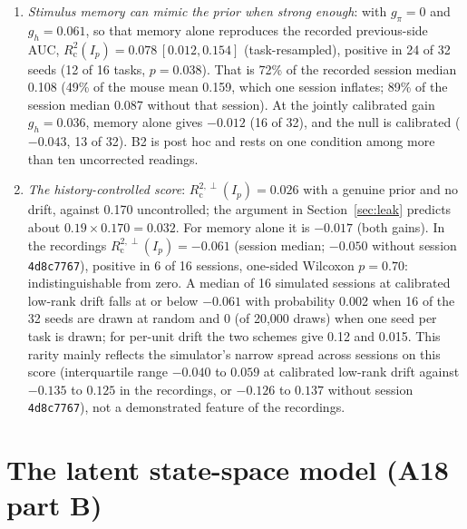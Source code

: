 \documentclass[11pt]{article}
\newcommand{\Rc}{R^2_{\mathrm{c}}}
\begin{document}
\begin{enumerate}
  therefore does not show that a prior is needed.
\item \emph{Stimulus memory can mimic the prior when strong enough}: with $g_\pi = 0$ and $g_h = 0.061$, so that memory
  alone reproduces the recorded previous-side AUC, $\Rc(I_p) = 0.078\,[0.012, 0.154]$ (task-resampled), positive in 24 of 32 seeds (12
  of 16 tasks, $p = 0.038$). That is 72\% of the recorded session median 0.108 (49\% of the mouse mean 0.159, which one
  session inflates; 89\% of the session median 0.087 without that session). At the jointly calibrated gain
  $g_h = 0.036$, memory alone gives $-0.012$ (16 of 32), and the null is calibrated ($-0.043$, 13 of 32). B2 is post hoc
  and rests on one condition among more than ten uncorrected readings.
\item \emph{The history-controlled score}: $R^{2,\perp}_{\mathrm{c}}(I_p) = 0.026$ with a genuine prior and no drift, against
  0.170 uncontrolled; the argument in Section~\ref{sec:leak} predicts about $0.19 \times 0.170 = 0.032$. For memory
  alone it is $-0.017$ (both gains). In the recordings $R^{2,\perp}_{\mathrm{c}}(I_p) = -0.061$ (session median;
  $-0.050$ without session \texttt{4d8c7767}), positive in 6 of 16 sessions, one-sided Wilcoxon $p = 0.70$:
  indistinguishable from zero. A median of 16 simulated sessions at calibrated low-rank drift falls at or below
  $-0.061$ with probability 0.002 when 16 of the 32 seeds are drawn at random and 0 (of 20,000 draws) when one seed per
  task is drawn; for per-unit drift the two schemes give 0.12 and 0.015. This rarity mainly reflects the simulator's
  narrow spread across sessions on this score (interquartile range $-0.040$ to $0.059$ at calibrated low-rank drift
  against $-0.135$ to $0.125$ in the recordings, or $-0.126$ to $0.137$ without session \texttt{4d8c7767}), not a
  demonstrated feature of the recordings.
\end{enumerate}

\section{The latent state-space model (A18 part B)}
\label{sec:lds}
\end{document}
